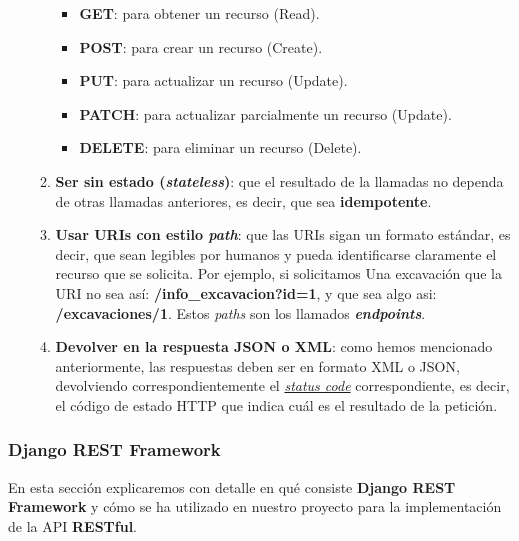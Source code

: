 \begin{itemize}
\begin{enumerate}
                    \begin{itemize}
                        \item \textbf{GET}: para obtener un recurso (Read).
                        \item \textbf{POST}: para crear un recurso (Create).
                        \item \textbf{PUT}: para actualizar un recurso (Update).
                        \item \textbf{PATCH}: para actualizar parcialmente un
                        recurso (Update).
                        \item \textbf{DELETE}: para eliminar un recurso (Delete).
                    \end{itemize}

                \item \textbf{Ser sin estado (\textit{stateless})}: que el resultado de la
                llamadas no dependa de otras llamadas anteriores, es decir, que sea
                \textbf{idempotente}.
                \item \textbf{Usar URIs con estilo \textit{path}}: que las URIs sigan un formato
                estándar, es decir, que sean legibles por humanos y pueda identificarse
                claramente el recurso que se solicita. Por ejemplo, si solicitamos Una
                excavación que la URI no sea así: \textbf{/info\_excavacion?id=1}, y que
                sea algo asi: \textbf{/excavaciones/1}. Estos \textit{paths} son los
                llamados \textbf{\textit{endpoints}}.
                \item \textbf{Devolver en la respuesta JSON o XML}: como hemos mencionado
                anteriormente, las respuestas deben ser en formato XML o JSON,
                devolviendo correspondientemente el
                \href{https://developer.mozilla.org/es/docs/Web/HTTP/Status}
                {\textit{status code}} correspondiente, es decir, el código de estado HTTP
                que indica cuál es el resultado de la petición.
            \end{enumerate}
    \end{itemize}

\subsubsection{Django REST Framework}
En esta sección explicaremos con detalle  en qué consiste \textbf{Django REST Framework}
\cite{djangorestframework} y cómo se ha utilizado en nuestro proyecto para la
implementación de la API \textbf{RESTful}.\\

